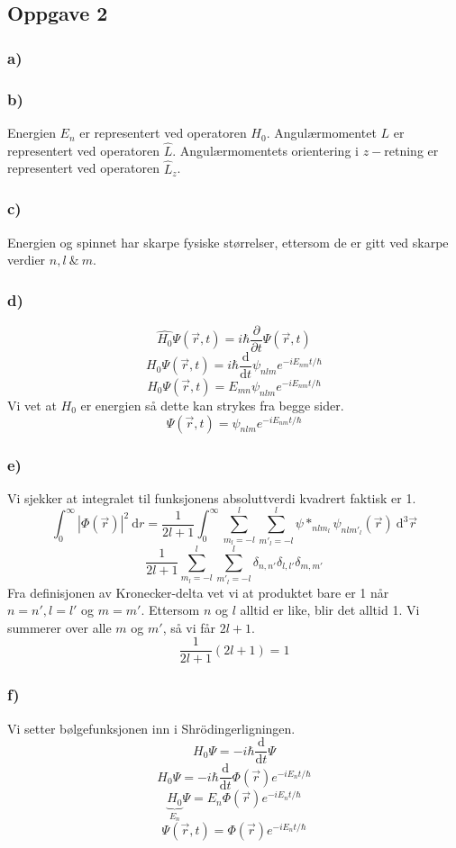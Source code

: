 \documentclass{article}
\begin{document}
\subsection*{Oppgave 2}
\subsubsection*{a)}

\subsubsection*{b)}
Energien $E_n$ er representert ved operatoren $\hat{H_0}$. 
Angulærmomentet $L$ er representert ved operatoren $\hat{L}$. 
Angulærmomentets orientering i $z-$retning er representert ved operatoren $\hat{L}_z$. 

\subsubsection*{c)}
Energien og spinnet har skarpe fysiske størrelser, ettersom de er gitt ved skarpe verdier $n, l\ \&\ m$. 

\subsubsection*{d)}
\[
\hat{H_0} Ψ(\vec{r}, t) = iℏ \frac{∂}{∂t}Ψ(\vec{r},t)
\]
\[
H_0Ψ(\vec{r},t) =  iℏ \frac{\mathrm{d}}{\mathrm{d}t}ψ_{nlm}e^{-i E_{nm}t / ℏ}
\]
\[
H_0Ψ(\vec{r},t) = E_{mn} ψ_{nlm}e^{-i E_{nm}t / ℏ}
\]
Vi vet at $H_0$ er energien så dette kan strykes fra begge sider.
\[
Ψ(\vec{r},t) = ψ_{nlm}e^{-i E_{nm}t / ℏ}
\]

\subsubsection*{e)}
Vi sjekker at integralet til funksjonens absoluttverdi kvadrert faktisk er 1.
\[
∫_{0}^{∞} \left|Φ(\vec{r})\right|^2 \ \mathrm{d}r = \frac{1}{2l + 1} ∫_{0}^{∞} ∑_{m_l = -l}^{l} ∑_{m'_{l} = -l}^{l} ψ*_{nlm_{l}} ψ_{nlm'_{l}}(\vec{r}) \ \mathrm{d}^3\vec{r}
\]
\[
\frac{1}{2l + 1} ∑_{m_l = -l}^{l} ∑_{m'_l = -l}^{l}  δ_{n,n'} δ_{l,l'} δ_{m,m'}
\]
Fra definisjonen av Kronecker-delta vet vi at produktet bare er 1 når $n = n', l = l'$ og $m = m'$. 
Ettersom $n$ og $l$ alltid er like, blir det alltid 1. Vi summerer over alle $m$ og $m'$, så vi får $2l + 1$. 
\[
\frac{1}{2l + 1} (2l + 1) = 1
\]
\subsubsection*{f)}
Vi setter bølgefunksjonen inn i Shrödingerligningen. 
\[
H_0 Ψ = - iℏ \frac{\mathrm{d}}{\mathrm{d}t}Ψ
\]
\[
H_0 Ψ = -iℏ \frac{\mathrm{d}}{\mathrm{d}t} Φ(\vec{r}) e^{-iE_{n}t / ℏ}
\]
\[
\underbrace{H_0}_{E_n} Ψ = E_n Φ(\vec{r}) e^{-iE_{n}t / ℏ}
\]
\[
Ψ(\vec{r},t) = Φ(\vec{r}) e^{-iE_{n}t / ℏ}
\]
\end{document}
